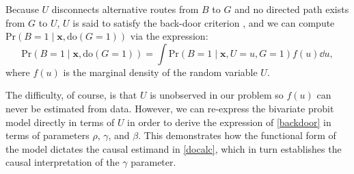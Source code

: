 \documentclass[aoas,preprint, 11pt, dvipsnames, table, x11name]{imsart}
\theoremstyle{remark}
\begin{document}
	Because $U$ disconnects alternative routes from $B$ to $G$ and no directed path exists from $G$ to $U$, $U$ is said to satisfy the back-door criterion \cite{pearl-2000}, and we can compute $\mbox{Pr}(B = 1 \mid \mathbf{x}, \text{do}(G = 1))$ via the expression:
	\begin{equation}\label{backdoor}
		\mbox{Pr}(B = 1 \mid \mathbf{x}, \text{do}(G = 1)) =  \int  \mbox{Pr}(B = 1 \mid \mathbf{x}, U=u, G = 1) f(u) \dd u,
	\end{equation}
	where $f(u)$ is the marginal density of the random variable $U$.
	
	The difficulty, of course, is that $U$ is unobserved in our problem so $f(u)$ can never be estimated from data.  However, we can re-express the bivariate probit model directly in terms of $U$ in order to derive the  expression  of \autoref{backdoor} in terms of parameters $\rho$, $\gamma$, and $\beta$.  This demonstrates how the functional form of the model dictates the causal estimand in \autoref{docalc}, which in turn establishes the causal interpretation of the $\gamma$ parameter.  
	
\end{document}
